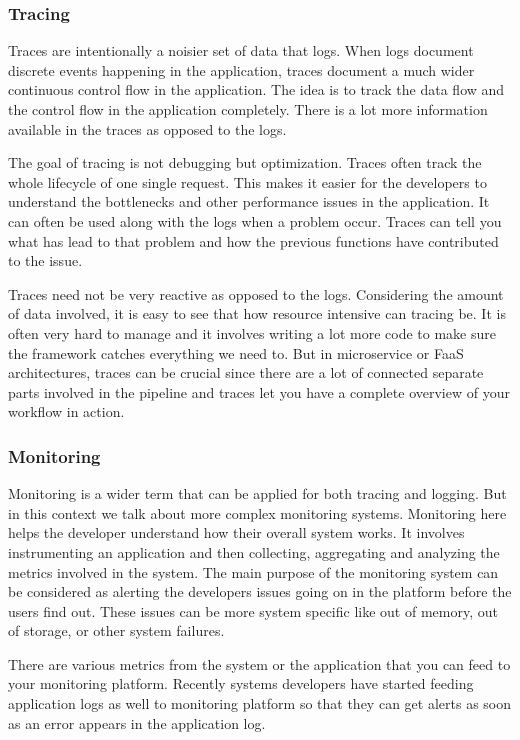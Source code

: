 \documentclass[12pt,titlepage]{article}
\begin{document}
\subsubsection{Tracing}
\label{sec:orga64a8ee}
Traces are intentionally a noisier set of data that logs. When logs document
discrete events happening in the application, traces document a much wider
continuous control flow in the application. The idea is to track the data flow
and the control flow in the application completely. There is a lot more
information available in the traces as opposed to the logs.

The goal of tracing is not debugging but optimization. Traces often track the
whole lifecycle of one single request. This makes it easier for the developers
to understand the bottlenecks and other performance issues in the application.
It can often be used along with the logs when a problem occur. Traces can tell
you what has lead to that problem and how the previous functions have
contributed to the issue.

Traces need not be very reactive as opposed to the logs. Considering the amount
of data involved, it is easy to see that how resource intensive can tracing be.
It is often very hard to manage and it involves writing a lot more code to make
sure the framework catches everything we need to. But in microservice or FaaS
architectures, traces can be crucial since there are a lot of connected separate
parts involved in the pipeline and traces let you have a complete overview of
your workflow in action.

\subsubsection{Monitoring}
\label{sec:orge185371}
Monitoring is a wider term that can be applied for both tracing and logging. But
in this context we talk about more complex monitoring systems. Monitoring here
helps the developer understand how their overall system works. It involves
instrumenting an application and then collecting, aggregating and analyzing the
metrics involved in the system. The main purpose of the monitoring system can be
considered as alerting the developers issues going on in the platform before the
users find out. These issues can be more system specific like out of memory, out
of storage, or other system failures.

There are various metrics from the system or the application that you can feed
to your monitoring platform. Recently systems developers have started feeding
application logs as well to monitoring platform so that they can get alerts as
soon as an error appears in the application log.
\end{document}
